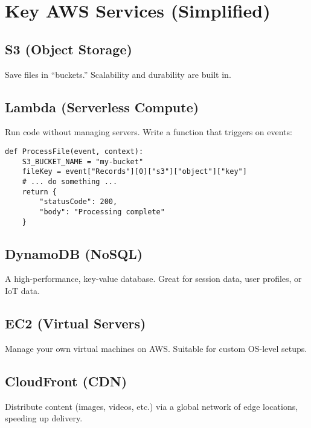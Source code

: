 \documentclass[12pt]{article}
\begin{document}
\clearpage

\section{Key AWS Services (Simplified)}
\justifying

\subsection{S3 (Object Storage)}
Save files in “buckets.” Scalability and durability are built in.

\subsection{Lambda (Serverless Compute)}
Run code without managing servers. Write a function that triggers on events:

\begin{verbatim}
def ProcessFile(event, context):
    S3_BUCKET_NAME = "my-bucket"
    fileKey = event["Records"][0]["s3"]["object"]["key"]
    # ... do something ...
    return {
        "statusCode": 200,
        "body": "Processing complete"
    }
\end{verbatim}

\subsection{DynamoDB (NoSQL)}
A high-performance, key-value database. Great for session data, user profiles, or IoT data.

\subsection{EC2 (Virtual Servers)}
Manage your own virtual machines on AWS. Suitable for custom OS-level setups.

\subsection{CloudFront (CDN)}
Distribute content (images, videos, etc.) via a global network of edge locations, speeding up delivery.

\clearpage

\end{document}
